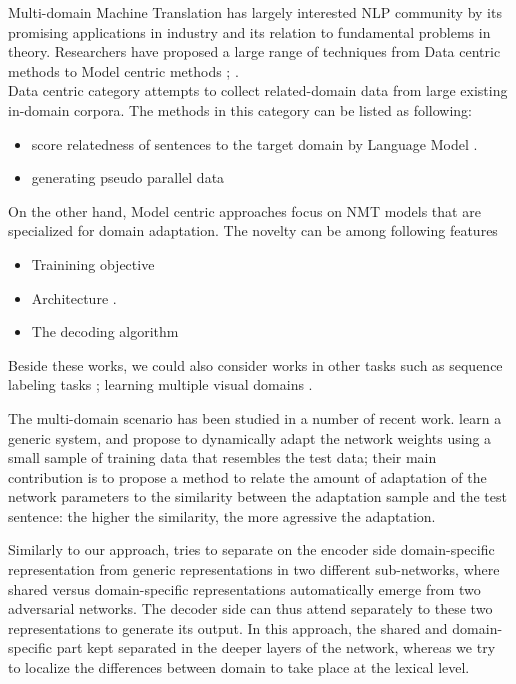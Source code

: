 \documentclass[11pt,a4paper]{article}
\newcommand{\fyTodo}[1]{\Todo[FY:]{\textcolor{orange}{#1}}}
\begin{document}
Multi-domain Machine Translation has largely interested NLP community by its promising applications in industry and its relation to fundamental problems in theory. Researchers have proposed a large range of techniques from Data centric methods to Model centric methods \cite{Chu18asurvey}; \cite{P17-2061}.\\ Data centric category attempts to collect related-domain data from large existing in-domain corpora. The methods in this category can be listed as following:
\fyTodo{Organize refs}
\begin{itemize}
\item score relatedness of sentences to the target domain by Language Model \cite{P10-2041,D11-1033,P13-2119}.
\item generating pseudo parallel data \cite{P03-1010,C16-1295,D14-1023}
\end{itemize}
On the other hand, Model centric approaches focus on NMT models that are specialized for domain adaptation. The novelty can be among following features
\begin{itemize}
\item Trainining objective \cite{Luong2015SNMT,Senrich2016Mono,Wang2017Instance,Chen2017Cost,Miceli2017Regularize,Zhang18sentence}
\item Architecture \cite{gulcehre2016monolingual,Zhang16topicinformed,Kobus17domaincontrol,Britz2017mixing,Biao2017CARENMT,Britz2017mixing,Thompson18freezing,Michel2018extreme}.
\item The decoding algorithm \cite{gulcehre2016monolingual,Khayrallah2017lattice}
\end{itemize}

Beside these works, we could also consider works in other tasks such as sequence labeling tasks \cite{Daume07frustratingly}; learning multiple visual domains \cite{Rebuffi2017Visual}.

The multi-domain scenario has been studied in a number of recent work. \citet{Farajian17multidomain} learn a generic system, and propose to dynamically adapt the network weights using a small sample of training data that resembles the test data; their main contribution is to propose a method to relate the amount of adaptation of the network parameters to the similarity between the adaptation sample and the test sentence: the higher the similarity, the more agressive the adaptation.

Similarly to our approach, \cite{Zeng18multidomain} tries to separate on the encoder side domain-specific representation from generic representations in two different sub-networks, where shared versus domain-specific representations automatically emerge from two adversarial networks. The decoder side can thus attend separately to these two representations to generate its output. In this approach, the shared and domain-specific part kept separated in the deeper layers of the network, whereas we try to localize the differences between domain to take place at the lexical level.
\end{document}
